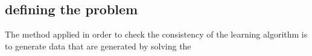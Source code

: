 \subsection{defining the problem}




The method applied in order to check the consistency of the learning algorithm is to generate data that are generated by solving the 











%
%
%
%
%
%
%
%
